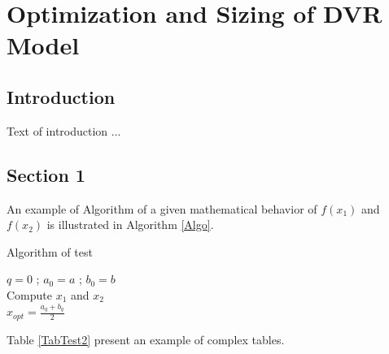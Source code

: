 \chapter{Optimization and Sizing of DVR Model} 

\section{Introduction}

Text of introduction ...

\section{Section 1}

An example of Algorithm of a given mathematical behavior of $f(x_1)$ and $f(x_2)$ is illustrated in Algorithm \eqref{Algo}.

\begin{algorithm}[!h]
	\caption{Algorithm of test}
	$q=0$ ; $a_0=a$ ; $b_0=b$ \\
	Compute $x_1$ and $x_2$ \\
	$x_{opt}=\frac{a_{q}+b_{q}}{2}$
	\label{Algo}
\end{algorithm}

Table \ref{TabTest2} present an example of complex tables.

\newpage

